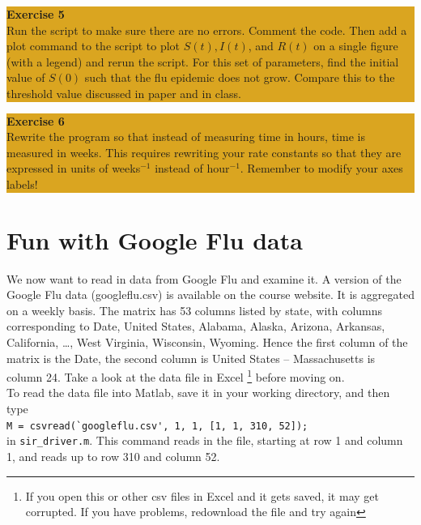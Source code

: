 \documentclass[12pt]{amsart}
\begin{document}
\begin{center}
\colorbox{Goldenrod}{\parbox{15cm}{
{
\textbf{\large Exercise 5}\vspace{1mm} \\
Run the script to make sure there are no errors.   Comment the code.  Then add a plot command to the script to plot $S(t), I(t)$, and $R(t)$ on a single figure (with a legend) and rerun the script.  For this set of parameters,  find the initial value of $S(0)$ such that the flu epidemic does not grow.  Compare this to the threshold value discussed in paper and in class.
}}}
\end{center}

\begin{center}
\colorbox{Goldenrod}{\parbox{15cm}{
{
\textbf{\large Exercise 6}\vspace{1mm} \\
Rewrite the program so that instead of measuring time in hours, time is measured in weeks.  This requires rewriting your rate constants so that they are expressed in units of weeks$^{-1}$ instead of hour$^{-1}$.  Remember to modify your axes labels!
}}}
\end{center}

\section{Fun with Google Flu data}

\noindent We now want to read in data from Google Flu and examine it.  A version of the Google Flu data (googleflu.csv) is available on the course website. It is aggregated on a weekly basis.  The matrix has 53 columns listed by state, with columns corresponding to Date, United States, Alabama, Alaska, Arizona, Arkansas, California, \ldots, West Virginia, Wisconsin, Wyoming.  Hence the first column of the matrix is the Date, the second column is United States -- Massachusetts is column 24.  Take a look at the data file in Excel  \footnote{If you open this or other csv files in Excel and it gets saved, it may get corrupted.  If you have problems, redownload the file and try again} before moving on. \\

\noindent To read the data file into Matlab, save it in your working directory, and then type \\

\verb+M = csvread(`googleflu.csv', 1, 1, [1, 1, 310, 52]);+ \\

\noindent in \verb+sir_driver.m+.  This command reads in the file, starting at row 1 and column 1, and reads up to row 310 and column 52. \\
\end{document}
